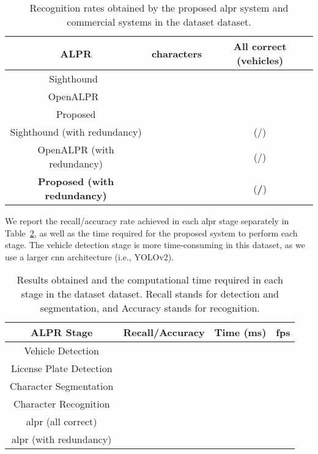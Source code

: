 \begin{table}[!htb]
	\centering
	\caption{Recognition rates obtained by the proposed \gls*{alpr} system and commercial systems in the \acrshort*{dataset} dataset.}
	\label{tab:dataset_results}
	{
		\renewcommand{\arraystretch}{1.1}
		\begin{tabular}{@{}ccc@{}}
			\toprule
			ALPR &   characters & All correct (vehicles)\\ \midrule
			Sighthound~\cite{masood2017sighthound} &  &  \\ 
			OpenALPR~\cite{openalpr} &  &  \\
			Proposed &  &  \\ \midrule
			Sighthound (with redundancy) &  &  (/) \\
			OpenALPR (with redundancy) &  &  (/)\\ 
			\textbf{Proposed (with redundancy)} &  &  (\textbf{/}) \\ \bottomrule
		\end{tabular}
	}
\end{table}

We report the recall/accuracy rate achieved in each \gls*{alpr} stage separately in Table~\ref{tab:dataset_fps}, as well as the time required for the proposed system to perform each stage. The vehicle detection stage is more time-consuming in this dataset, as we use a larger \gls*{cnn} architecture (i.e., YOLOv2).

\begin{table}[!htb]
	\centering
	\caption{Results obtained and the computational time required in each stage in the \acrshort*{dataset} dataset. Recall stands for detection and segmentation, and Accuracy stands for recognition.}
	\label{tab:dataset_fps}
	\begin{tabular}{@{}cccc@{}}
		\toprule
		ALPR Stage & Recall/Accuracy & Time (ms) & \gls*{fps} \\ \midrule
		Vehicle Detection &  &  &  \\
		License Plate Detection &  &  &  \\
		Character Segmentation &  &  &  \\
		Character Recognition &  &    &  \\ \midrule 
		\gls*{alpr} (all correct) & & \multirow{2}{*}{} & \multirow{2}{*}{} \\
		\gls*{alpr} (with redundancy) & & & \\ \bottomrule
	\end{tabular}
\end{table}

